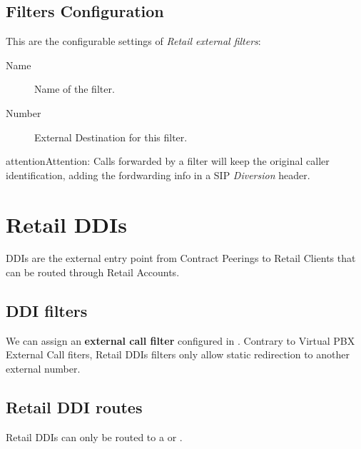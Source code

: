 \documentclass[letterpaper,10pt,english]{sphinxmanual}
\begin{document}
\subsection{Filters Configuration}
\label{retail/filters:filters-configuration}
This are the configurable settings of \emph{Retail external filters}:
\begin{description}
\item[{Name}] \leavevmode{}\label{retail/filters:term-name}
Name of the filter.

\item[{Number}] \leavevmode{}\label{retail/filters:term-number}
External Destination for this filter.

\end{description}

\begin{notice}{attention}{Attention:}
Calls forwarded by a filter will keep the original
caller identification, adding the fordwarding info in a SIP
\emph{Diversion} header.
\end{notice}


\section{Retail DDIs}
\label{retail/ddis::doc}\label{retail/ddis:retail-ddis}\label{retail/ddis:id1}
DDIs are the external entry point from Contract Peerings to Retail Clients that
can be routed through Retail Accounts.


\subsection{DDI filters}
\label{retail/ddis:ddi-filters}
We can assign an \textbf{external call filter} configured in {\hyperref[retail/filters:retail\string-filters]{}}. Contrary to Virtual PBX External Call fiters, Retail DDIs
filters only allow static redirection to another external number.


\subsection{Retail DDI routes}
\label{retail/ddis:retail-ddi-routes}
Retail DDIs can only be routed to a {\hyperref[retail/accounts:retail\string-accounts]{}}
or {\hyperref[company/faxing:faxing\string-system]{}}.
\end{document}

